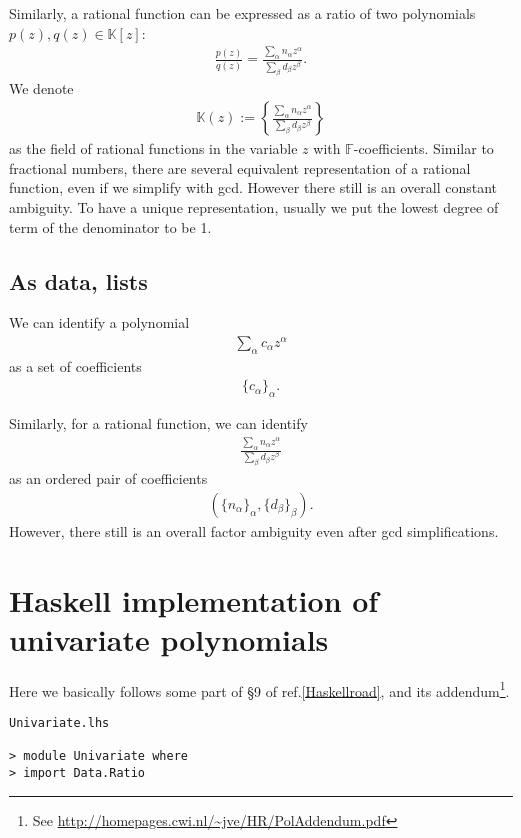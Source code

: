 \documentclass[11pt]{book}
\begin{document}
Similarly, a rational function can be expressed as a ratio of two polynomials $p(z),q(z) \in \mathbb{K}[z]$:
\begin{eqnarray}
\frac{p(z)}{q(z)} = \frac{\sum_\alpha n_\alpha z^\alpha}{\sum_\beta d_\beta z^\beta}.
\end{eqnarray}
We denote
\begin{eqnarray}
\mathbb{K}(z) := \left\{ \frac{\sum_\alpha n_\alpha z^\alpha}{\sum_\beta d_\beta z^\beta} \right\}
\end{eqnarray}
as the field of rational functions in the variable $z$ with $\mathbb{F}$-coefficients.
Similar to fractional numbers, there are several equivalent representation of a rational function, even if we simplify with gcd.
However there still is an overall constant ambiguity.
To have a unique representation, usually we put the lowest degree of term of the denominator to be 1.

\subsection{As data, lists}
We can identify a polynomial
\begin{eqnarray}
\sum_\alpha c_\alpha z^\alpha
\end{eqnarray}
as a set of coefficients
\begin{eqnarray}
\{ c_\alpha\}_{\alpha}.
\end{eqnarray}

Similarly, for a rational function, we can identify
\begin{eqnarray}
\frac{\sum_\alpha n_\alpha z^\alpha}{\sum_\beta d_\beta z^\beta}
\end{eqnarray}
as an ordered pair of coefficients
\begin{eqnarray}
(\{ n_\alpha\}_\alpha, \{ d_\beta\}_\beta).
\end{eqnarray}
However, there still is an overall factor ambiguity even after gcd simplifications.

\section{Haskell implementation of univariate polynomials}
Here we basically follows some part of \S9 of ref.\ref{Haskellroad}, and its addendum\footnote{
See \url{http://homepages.cwi.nl/~jve/HR/PolAddendum.pdf}
}.

\begin{verbatim}
Univariate.lhs

> module Univariate where
> import Data.Ratio
\end{verbatim}
\end{document}
